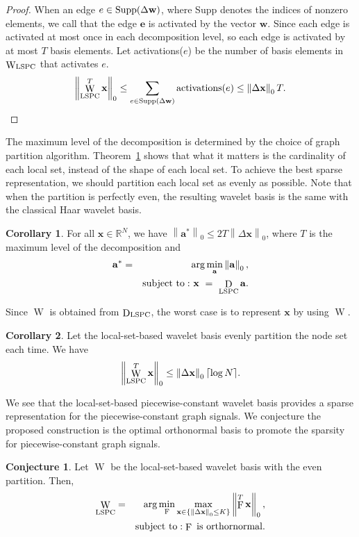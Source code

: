 \documentclass[journal,twocolumn,10pt]{IEEEtran}
\theoremstyle{definition}
\newtheorem{myCorollary}{Corollary}
\newtheorem{myConj}{Conjecture}
\newcommand{\R}{\ensuremath{\mathbb{R}}}
\DeclarePairedDelimiter\ceil{\lceil}{\rceil}
\def\a{\mathbf{a}}
\def\x{\mathbf{x}}
\def\e{\mathbf{e}}
\def\w{\mathbf{w}}
\DeclareMathOperator{\D}{D}
\DeclareMathOperator{\F}{F}
\DeclareMathOperator{\W}{W}
\begin{document}
\begin{proof}
When an edge $e \in {\rm Supp}(\Delta \w)$, where Supp denotes the indices of nonzero elements, we call that the edge $\e$ is activated by the vector $\w$. Since each edge is activated at most once in each decomposition level, so each edge is activated by at most $T$ basis elements. Let activations($e$) be the number of basis elements in $\W_{\rm LSPC}$ that activates $e$. 
\begin{eqnarray*}
\left\| \W_{\rm LSPC}^T \x \right\|_0 \leq  \sum_{ e \in {\rm Supp}(\Delta \w) }  {\rm activations}(e) \leq \left\|  \Delta \x \right\|_0  T.
\end{eqnarray*}
\end{proof}
The maximum level of the decomposition is determined by the choice of graph partition algorithm. Theorem~\ref{thm:sparse} shows that what it matters is the cardinality of each local set, instead of the shape of each local set. To achieve the best sparse representation, we should partition each local set as evenly as possible. Note that when the partition is perfectly even, the resulting wavelet basis is the same with the classical Haar wavelet basis.

\begin{myCorollary}
\label{thm:sparse}
For all $\x \in \R^N$,  we have $\left\| \a^* \right\|_0 \leq  2 T \left\|  \Delta \x \right\|_0$, where $T$ is the maximum level of the decomposition and
\begin{eqnarray*}
\a^* & = &   \arg \min_{\a}   \left\| \a \right\|_0, 
\\
   && {\rm subject~to:~}  \x \ = \ \D_{\rm LSPC} \a.
\end{eqnarray*}
\end{myCorollary}
Since $\W$ is obtained from $ \D_{\rm LSPC}$,  the worst case is to represent $\x$ by using $\W$. 



\begin{myCorollary}
Let the local-set-based wavelet basis evenly partition the node set each time. We have
\begin{eqnarray*}
\left\| \W_{\rm LSPC}^T \x \right\|_0 \leq  \left\|  \Delta \x \right\|_0 \ceil*{\log N}.
\end{eqnarray*}
\end{myCorollary}
We see that the local-set-based piecewise-constant wavelet basis provides a sparse representation for the piecewise-constant graph signals. We conjecture the proposed construction is the optimal orthonormal basis to promote the sparsity for piecewise-constant graph signals.
\begin{myConj} Let $\W$ be the local-set-based wavelet basis with the even partition. Then,
\begin{eqnarray*}
 \W_{\rm LSPC} & = & \arg \min_{\F}  \max_{\x \in \{ \left\|  \Delta \x \right\|_0 \leq K \} }  \left\|  \F^T \x \right\|_0, 
 \\
 && {\rm subject~to}: \F {\rm~is~orthornormal}.
\end{eqnarray*}
\end{myConj}
\end{document}
